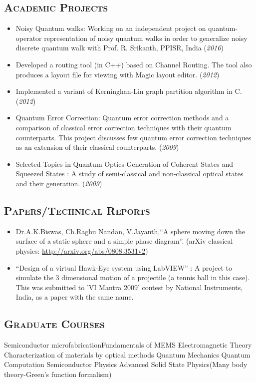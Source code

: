 \documentclass[10pt]{article}
\begin{document}
\subsection*{\textsc{\large Academic Projects}}
\begin{itemize}
\item Noisy Quantum walks: Working on an independent project on quantum-operator representation of noisy quantum walks in order to generalize noisy discrete quantum walk with Prof. R. Srikanth, PPISR, India (\textit{2016})
\item Developed a routing tool (in C++) based on Channel Routing. The tool also produces a layout file for viewing with Magic layout editor. (\textit{2012})
\item Implemented a variant of Kerninghan-Lin graph partition algorithm in C.(\textit{2012})
\item Quantum Error Correction: Quantum error correction methods and a comparison of classical error correction techniques with their quantum counterparts. This project discusses few quantum error correction techniques as an extension of their classical counterparts. (\textit{2009})
\item Selected Topics in Quantum Optics-Generation of Coherent States and Squeezed States : A study of semi-classical and non-classical optical states and their generation. (\textit{2009})
\end{itemize}

\subsection*{\textsc{\large Papers/Technical Reports}}
\begin{itemize}
\item Dr.A.K.Biswas, Ch.Raghu Nandan, V.Jayanth,``A sphere moving down the surface of a static sphere and a simple phase diagram''. (arXiv classical physics: \url{http://arxiv.org/abs/0808.3531v2})

\item ``Design of a virtual Hawk-Eye system using LabVIEW'' : A project to simulate the 3 dimensional motion of a projectile (a tennis ball in this case). This was submitted to 'VI Mantra 2009' contest by National Instruments, India, as a paper with the same name.
 \end{itemize}

\subsection*{\textsc{\large Graduate Courses}}
Semiconductor microfabrication\hfill Fundamentals of MEMS \newline 
Electromagnetic Theory \hfill Characterization of materials by optical methods \newline
Quantum Mechanics \hfill Quantum Computation \newline
Semiconductor Physics \hfill Advanced Solid State Physics(Many body theory-Green's function formalism)
\end{document}
